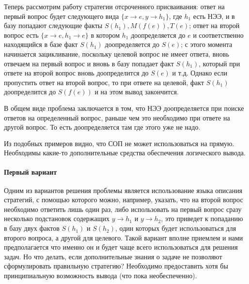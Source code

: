 Теперь рассмотрим работу стратегии отсроченного присваивания: ответ на первый вопрос будет следующего вида $\{ x\rightarrow e, y\rightarrow h_1 \}$, где $h_1$ есть НЭЭ, и в базу попадают следующие факты $S(h_1),M(f(e)),T(e)$; ответ на второй вопрос есть $\{ x\rightarrow e, h_1\rightarrow e \}$ в котором $h_1$ доопределяется до $e$ и соответственно находящийся в базе факт $S(h_1)$ доопределяется до $S(e)$; с этого момента начинается зацикливание, поскольку целевой вопрос не имеет ответа, вновь отвечаем на первый вопрос и вновь в базу попадает факт $S(h_1)$, который при ответе на второй вопрос вновь доопределится до $S(e)$ и т.д. Однако если пропустить ответ на второй вопрос, то при ответе на целевой, факт $S(h_1)$ доопределится до $S(f(e))$ и на этом вывод закончится.

В общем виде проблема заключается в том, что НЭЭ доопределяется при поиске ответов на определенный вопрос, раньше чем это необходимо при ответе на другой вопрос. То есть доопределяется там где этого уже не надо.

Из подобных примеров видно, что СОП не может использоваться на прямую. Необходимы какие-то дополнительные средства обеспечения логического вывода.

\paragraph{Первый вариант}
Одним из вариантов решения проблемы является использование языка описания стратегий, с помощью которого можно, например, указать, что на второй вопрос необходимо ответить лишь один раз, либо использовать на первый вопрос сразу несколько подстановок содержащих $y\rightarrow h_1$ и $y\rightarrow h_2$, это приведет к попаданию в базу двух фактов $S(h_1)$ и $S(h_2)$, один которых будет использоваться для второго вопроса, а другой для целевого. Такой вариант вполне приемлем и нами предполагается что именно он и будет чаще всего использоваться для решения задач. Но что делать, если дополнительные знания о задаче не позволяют сформулировать правильную стратегию? Необходимо предоставить хотя бы принципиальную возможность вывода (что пока необеспеченно).

